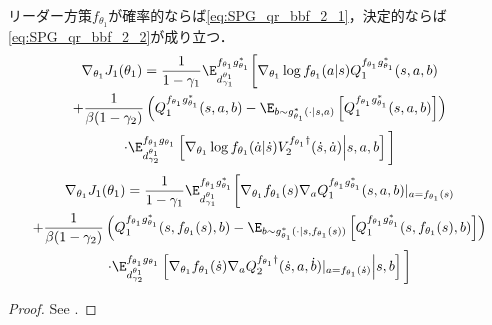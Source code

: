 \documentclass[a4paper,10pt,dvipdfmx]{jsarticle}
\begin{document}
\begin{theorem}\label{thrm:SPG_qr_bbf_2}
    リーダー方策$f_{\theta_1}$が確率的ならば\cref{eq:SPG_qr_bbf_2_1}，決定的ならば\cref{eq:SPG_qr_bbf_2_2}が成り立つ．
    \begin{multline}
        \nabla_{\theta_1}J_1(\theta_1)
        =\dfrac{1}{1-\gamma_1}\E_{d_{\gamma_1}^{\theta_1}}^{f_{\theta_1}g_{\theta_1}^*}\bigg[\nabla_{\theta_1}\log f_{\theta_1}(a|s)Q_1^{f_{\theta_1}g_{\theta_1}^*}(s,a,b)\\
        +\dfrac{1}{\beta(1-\gamma_2)}\left(Q_1^{f_{\theta_1}g_{\theta_1}^*}(s,a,b)-\E_{b\sim g_{\theta_1}^*(\cdot|s,a)}\left[Q_1^{f_{\theta_1}g_{\theta_1}^*}(s,a,b)\right]\right)\\
        \cdot\E_{d_{\gamma_2}^{\theta_1}}^{f_{\theta_1}g_{\theta_1}}\left[\nabla_{\theta_1}\log f_{\theta_1}(\dot{a}|\dot{s})V_2^{f_{\theta_1}\dag}(\dot{s},\dot{a})\middle|s,a,b\right]\bigg]\label{eq:SPG_qr_bbf_2_1}
    \end{multline}
    \begin{multline}
        \nabla_{\theta_1}J_1(\theta_1)
        =\dfrac{1}{1-\gamma_1}\E_{d_{\gamma_1}^{\theta_1}}^{f_{\theta_1}g_{\theta_1}^*}\bigg[\nabla_{\theta_1}f_{\theta_1}(s)\nabla_{a}Q_1^{f_{\theta_1}g_{\theta_1}^*}(s,a,b)|_{a=f_{\theta_1}(s)}\\
        +\dfrac{1}{\beta(1-\gamma_2)}\left(Q_1^{f_{\theta_1}g_{\theta_1}^*}(s,f_{\theta_1}(s),b)-\E_{b\sim g_{\theta_1}^*(\cdot|s,f_{\theta_1}(s))}\left[Q_1^{f_{\theta_1}g_{\theta_1}^*}(s,f_{\theta_1}(s),b)\right]\right)\\
        \cdot\E_{d_{\gamma_2}^{\theta_1}}^{f_{\theta_1}g_{\theta_1}}\left[\nabla_{\theta_1}f_{\theta_1}(\dot{s})\nabla_{a}Q_2^{f_{\theta_1}\dag}(\dot{s},a,\dot{b})|_{a=f_{\theta_1}(\dot{s})}\middle|s,b\right]\bigg]
        \label{eq:SPG_qr_bbf_2_2}
    \end{multline}
\end{theorem}
\begin{proof}
    See .
\end{proof}
\end{document}
